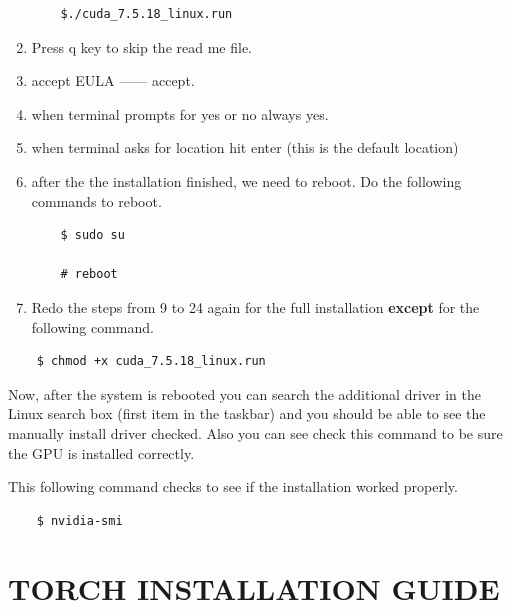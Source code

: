 \documentclass[12pt]{article}
\begin{document}
\begin{enumerate}
\begin{lstlisting}
    $./cuda_7.5.18_linux.run
\end{lstlisting}

\item Press q key to skip the read me file.
\item accept EULA ------ accept.
\item when terminal prompts for yes or no always yes.
\item when terminal asks for location hit enter (this is the default location)
\item after the the installation finished, we need to reboot. Do the following commands to reboot.

\begin{lstlisting}
    $ sudo su

    # reboot
\end{lstlisting}

\item Redo the steps from 9 to 24 again for the full installation \textbf{except} for the following command.
\end{enumerate}

\begin{lstlisting}
    $ chmod +x cuda_7.5.18_linux.run
\end{lstlisting}

Now, after the system is rebooted you can search the additional driver in the Linux search box (first item in the taskbar) and you should be able to see the manually install driver checked. Also you can see check this command to be sure the GPU is installed correctly.

This following command checks to see if the installation worked properly.

\begin{lstlisting}
    $ nvidia-smi
\end{lstlisting}

\newpage
\section{TORCH INSTALLATION GUIDE}
\end{document}
